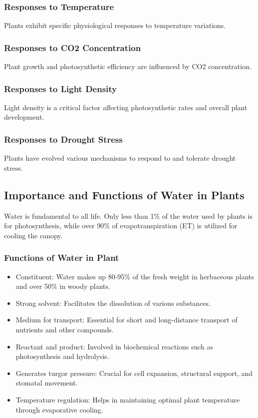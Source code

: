 \subsubsection*{Responses to Temperature} 
Plants exhibit specific physiological responses to temperature variations.

\subsubsection*{Responses to CO2 Concentration} 
Plant growth and photosynthetic efficiency are influenced by CO2 concentration.

\subsubsection*{Responses to Light Density} 
Light density is a critical factor affecting photosynthetic rates and overall plant development.

\subsubsection*{Responses to Drought Stress} 
Plants have evolved various mechanisms to respond to and tolerate drought stress.

\subsection{Importance and Functions of Water in Plants} 
Water is fundamental to all life. Only less than 1\% of the water used by plants is for photosynthesis, while over 90\% of evapotranspiration (ET) is utilized for cooling the canopy.

\subsubsection*{Functions of Water in Plant} 
\begin{itemize} 
    \item Constituent: Water makes up 80-95\% of the fresh weight in herbaceous plants and over 50\% in woody plants. 
    \item Strong solvent: Facilitates the dissolution of various substances. 
    \item Medium for transport: Essential for short and long-distance transport of nutrients and other compounds. 
    \item Reactant and product: Involved in biochemical reactions such as photosynthesis and hydrolysis. 
    \item Generates turgor pressure: Crucial for cell expansion, structural support, and stomatal movement. 
    \item Temperature regulation: Helps in maintaining optimal plant temperature through evaporative cooling. 
\end{itemize}

